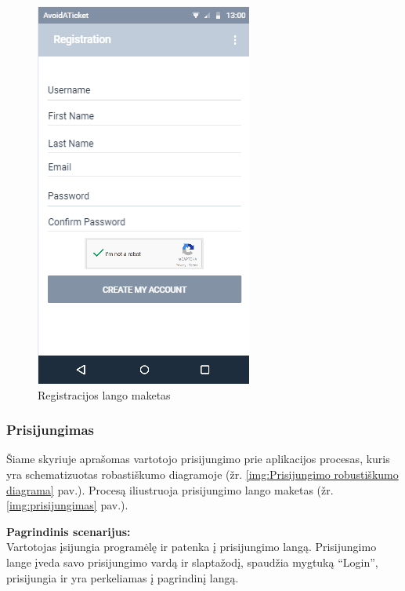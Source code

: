 \documentclass{VUMIFPSkursinis}
\begin{document}
	\begin{figure}[H]
				\centering
				\includegraphics[scale=0.55]{img/mockup_registration}
				\caption{Registracijos lango maketas}
				\label{img:registracija}
			\end{figure}

\subsubsection{Prisijungimas}
	Šiame skyriuje aprašomas vartotojo prisijungimo prie aplikacijos procesas, kuris yra schematizuotas robastiškumo diagramoje (žr. \ref{img:Prisijungimo robustiškumo diagrama} pav.). 
	Procesą iliustruoja prisijungimo lango maketas (žr. \ref{img:prisijungimas} pav.).

	\textbf{Pagrindinis scenarijus:}\\
	Vartotojas įsijungia programėlę ir patenka į prisijungimo langą. Prisijungimo lange įveda savo prisijungimo vardą ir slaptažodį, 
	spaudžia mygtuką “Login”, prisijungia ir yra perkeliamas į pagrindinį langą.
	
\end{document}
